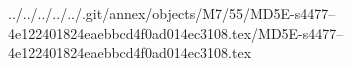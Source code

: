 ../../../../../.git/annex/objects/M7/55/MD5E-s4477--4e122401824eaebbcd4f0ad014ec3108.tex/MD5E-s4477--4e122401824eaebbcd4f0ad014ec3108.tex